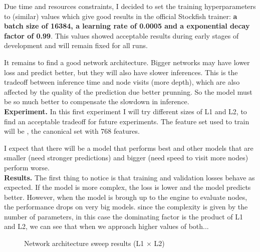 Due time and resources constraints, I decided to set the training hyperparameters to   (similar) values which give good results in the official Stockfish trainer: \textbf{a batch size of 16384, a learning rate of 0.0005 and a exponential decay factor of 0.99}. This values showed acceptable results during early stages of development and will remain fixed for all runs.

It remains to find a good network architecture. Bigger networks may have lower loss and predict better, but they will also have slower inferences. This is the tradeoff between inference time and node visits (more depth), which are also affected by the quality of the prediction due better prunning. So the model must be so much better to compensate the slowdown in inference. \\

\textbf{Experiment.}  In this first experiment I will try different sizes of L1 and L2,  to find an acceptable tradeoff for future experiments. The feature set used to train will be , the canonical set with 768 features.

I expect that there will be a model that performs best and other models that are smaller (need stronger predictions) and bigger (need speed to visit more nodes) perform worse. \\


\textbf{Results.} The first thing to notice is that training and validation losses behave as expected. If the model is more complex, the loss is lower and the model predicts better. However, when the model is brough up to the engine to evaluate nodes, the performance drops on very big models.
since the complexity is given by the number of parameters, in this case the dominating factor is the product of L1 and L2, we can see that when we approach higher values of both...

\begin{figure}[H]
\centering
{}
\caption{Network architecture sweep results (L1 $\times$ L2)}
\label{fig:asdasdasd}
\end{figure}

